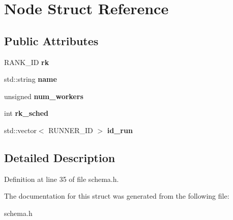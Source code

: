 \section{Node Struct Reference}
\label{struct_node}
\subsection*{Public Attributes}
\begin{CompactItemize}
\item 
RANK\_\-ID \bf{rk}\label{struct_node_7de6f254b6b8c3f9f8287af0bb742e9b}

\item 
std::string \bf{name}\label{struct_node_3c4318d71ca9a44fe33edcf8b7f26863}

\item 
unsigned \bf{num\_\-workers}\label{struct_node_01fec86d75332858b158c810d57caee3}

\item 
int \bf{rk\_\-sched}\label{struct_node_98deed2036c3dd8fc0f4fe8dacf56a92}

\item 
std::vector$<$ RUNNER\_\-ID $>$ \bf{id\_\-run}\label{struct_node_a90013b890888d3d252a71cb4fe48934}

\end{CompactItemize}


\subsection{Detailed Description}




Definition at line 35 of file schema.h.

The documentation for this struct was generated from the following file:\begin{CompactItemize}
\item 
schema.h\end{CompactItemize}
